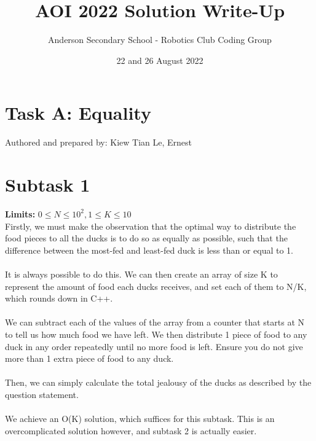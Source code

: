 \documentclass{report}
\title{AOI 2022 Solution Write-Up}
\author{Anderson Secondary School - Robotics Club Coding Group}
\date{22 and 26 August 2022}
\begin{document}
\setlength{\parindent}{0pt}

\maketitle

\pagebreak
\hfill \break \hfill \break

\section*{Task A: Equality}
Authored and prepared by: Kiew Tian Le, Ernest


\section*{Subtask 1}
\textbf{Limits: } $0 \leq N \leq 10^2, 1 \leq K \leq 10$\\
Firstly, we must make the observation that the optimal way to distribute the food pieces to all the ducks is to do so as equally as possible, such that the difference between the most-fed and least-fed duck is less than or equal to 1.\\\\
It is always possible to do this. We can then create an array of size K to represent the amount of food each ducks receives, and set each of them to N/K, which rounds down in C++.\\\\
We can subtract each of the values of the array from a counter that starts at N to tell us how much food we have left. We then distribute 1 piece of food to any duck in any order repeatedly until no more food is left. Ensure you do not give more than 1 extra piece of food to any duck.\\\\
Then, we can simply calculate the total jealousy of the ducks as described by the question statement.\\\\
We achieve an O(K) solution, which suffices for this subtask. This is an overcomplicated solution however, and subtask 2 is actually easier.
\end{document}
